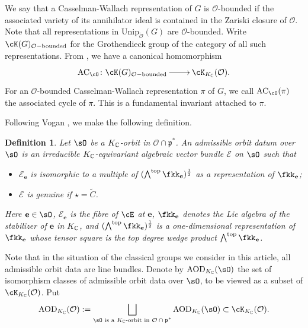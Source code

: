 \documentclass[12pt,a4paper]{amsart}
\newcommand{\CE}{{\mathcal {E}}}
\newcommand{\CO}{{\mathcal {O}}}
\newcommand{\p}{\mathfrak p}
\newcommand{\be}{\begin {equation}}
\newcommand{\ee}{\end {equation}}
\numberwithin{equation}{section}
\newtheorem{defn}[thm]{Definition}
\theoremstyle{remark}
\begin{document}
We say that a Casselman-Wallach representation of $G$ is  $\CO$-bounded  if
the associated variety  of its annihilator ideal
is contained in the Zariski closure of $\CO$. Note that all representations in $\mathrm{Unip}_{\check \CO}(G)$ are $\CO$-bounded. Write $\cK(G)_{\CO-\textrm{bounded}}$ for the  Grothendieck group of the category of all such representations.
From \cite[Theorem 2.13]{Vo89},  we have a canonical homomorphism
\[
\xymatrix{
  \mathrm{AC}_\cO\colon   \cK(G)_{\CO-\textrm{bounded}} \ar[r]& \cK_{K_\C}(\CO).
}
\]
For an $\CO$-bounded Casselman-Wallach representation $\pi$ of $G$, we call $ \mathrm{AC}_\cO(\pi)$ the associated cycle of $\pi$. This is a fundamental invariant attached to $\pi$.


Following Vogan \cite[Section 8]{Vo89}, we make the following definition.

\begin{defn}\label{defaod}
  Let $\sO$ be a $K_\C$-orbit in $\CO\cap \p^*$. An admissible orbit datum over
  $\sO$ is an irreducible $K_\C$-equivariant algebraic vector bundle $\CE$
  on $\sO$ such that
  \begin{itemize}
    \item $\CE_\mathbf e$ is isomorphic to a multiple of
    $(\bigwedge^{\mathrm{top}} \fkk_\mathbf e )^{\frac{1}{2}}$ as a representation of
    $\fkk_\mathbf e$;
    \item $\CE$ is genuine if $\star=\widetilde C$.
  \end{itemize}
  Here $\mathbf e\in \sO$, $\CE_\mathbf e$ is the fibre of $\cE$ at $\mathbf e$, $\fkk_\mathbf e$
  denotes the Lie algebra of the stabilizer of $\mathbf e$ in $K_\C$, and
  $(\bigwedge^{\mathrm{top}} \fkk_\mathbf e)^{\frac{1}{2}}$ is a one-dimensional
  representation of $\fkk_\mathbf e$ whose tensor square is the top degree wedge
  product $\bigwedge^{\mathrm{top}} \fkk_\mathbf e$.
\end{defn}

Note that in the situation of the classical groups we consider in this article, all admissible
orbit data are line bundles.  Denote by $\mathrm{AOD}_{K_\C}(\sO)$ the
set of isomorphism classes of admissible orbit data over $\sO$, to be viewed as
a subset of $\cK_{K_\C}(\CO)$. Put
\be\label{kgroupaod}
  \mathrm{AOD}_{K_\C}(\CO):=\bigsqcup_{\sO\textrm{ is a $K_\C$-orbit in
      $\CO\cap \p^*$}} \mathrm{AOD}_{K_\C}(\sO)\subset
  \cK_{K_\C}(\CO).
\ee

\end{document}
